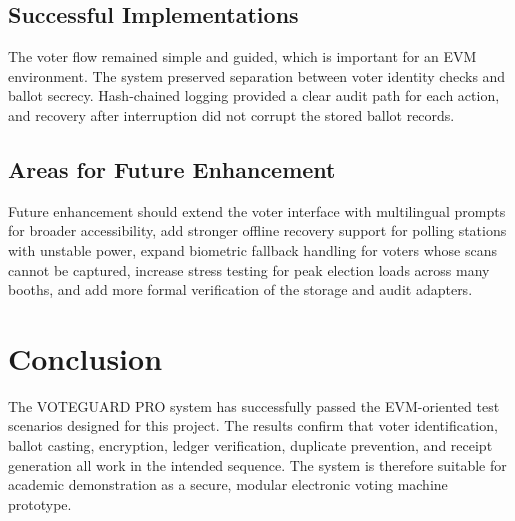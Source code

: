 \subsection{Successful Implementations}
The voter flow remained simple and guided, which is important for an EVM environment. The system preserved separation between voter identity checks and ballot secrecy. Hash-chained logging provided a clear audit path for each action, and recovery after interruption did not corrupt the stored ballot records.

\subsection{Areas for Future Enhancement}
Future enhancement should extend the voter interface with multilingual prompts for broader accessibility, add stronger offline recovery support for polling stations with unstable power, expand biometric fallback handling for voters whose scans cannot be captured, increase stress testing for peak election loads across many booths, and add more formal verification of the storage and audit adapters.

\section{Conclusion}

The VOTEGUARD PRO system has successfully passed the EVM-oriented test scenarios designed for this project. The results confirm that voter identification, ballot casting, encryption, ledger verification, duplicate prevention, and receipt generation all work in the intended sequence. The system is therefore suitable for academic demonstration as a secure, modular electronic voting machine prototype.

\clearpage
